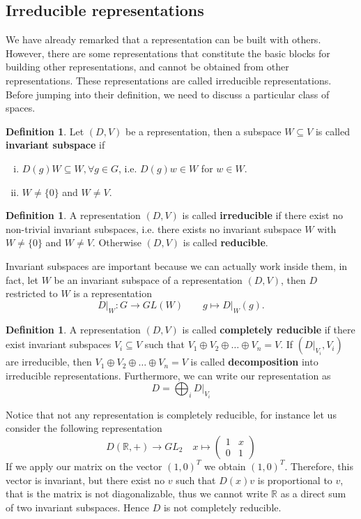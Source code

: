 \documentclass[12pt]{book}
\theoremstyle{plain}
\newcommand{\R}{\mathbb{R}}
\theoremstyle{definition}
\newtheorem{dfn}[thm]{Definition}
\theoremstyle{remark}
\begin{document}
\subsection{Irreducible representations}
We have already remarked that a representation can be built with others. However, there are some representations that constitute the basic blocks for building other representations, and cannot be obtained from other representations. These representations are called irreducible representations. Before jumping into their definition, we need to discuss a particular class of spaces.
\begin{dfn}
Let $(D,V)$ be a representation, then a subspace $W\subseteq V$ is called \textbf{invariant subspace} if
\begin{enumerate}[i.]
	\item $D(g)W\subseteq W, \forall g\in G$, i.e. $D(g)w\in W$ for $w\in W$.
	\item $W\neq \{0\}$ and $W\neq V$.
\end{enumerate}
\end{dfn}
\begin{dfn}
A representation $(D,V)$ is called \textbf{irreducible} if there exist no non-trivial invariant subspaces, i.e. there exists no invariant subspace $W$ with $W\neq\{0\}$ and $W\neq V$. Otherwise $(D,V)$ is called \textbf{reducible}.
\end{dfn}
Invariant subspaces are important because we can actually work inside them, in fact, let $W$ be an invariant subspace of a representation $(D,V)$, then $D$ restricted to $W$ is a representation
\[D\big|_W:G\to GL(W)\qquad g\mapsto D\big|_W(g).\]
\begin{dfn}
A representation $(D,V)$ is called \textbf{completely reducible} if there exist invariant subspaces $V_i\subseteq V$ such that $V_1\oplus V_2\oplus\dots\oplus V_n = V$. If  $(D\big|_{V_i},V_i)$ are irreducible, then $V_1\oplus V_2\oplus\dots\oplus V_n = V$ is called \textbf{decomposition} into irreducible representations. Furthermore, we can write our representation as
\[D = \bigoplus_{i}D\big|_{V_i}\]
\end{dfn}
Notice that not any representation is completely reducible, for instance let us consider the following representation
\[D(\R,+)\to GL_2\quad x\mapsto \begin{pmatrix}
  1 & x\\
  0 & 1 
 \end{pmatrix} \]
If we apply our matrix on the vector $(1,0)^{T}$ we obtain $(1,0)^{T}$. Therefore, this vector is invariant, but there exist no $v$ such that $D(x)v$ is proportional to $v$, that is the matrix is not diagonalizable, thus we cannot write $\R$ as a direct sum of two invariant subspaces. Hence $D$ is not completely reducible.\\
\end{document}
